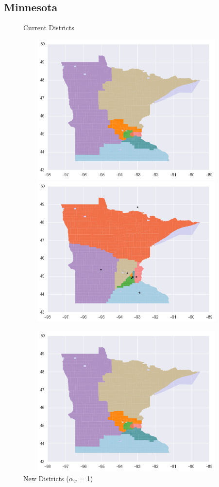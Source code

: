 \clearpage
\newpage

\subsection{Minnesota}
\begin{figure}[htb!] \centering
\caption{ Current Districts }
\includegraphics[width=5in,height=3in,keepaspectratio]{../maps/MN/static/before.png}
\includegraphics[width=5in,height=3in,keepaspectratio]{../maps/MN/static/0_0_after.png}
\caption{ New Districts ($\alpha_w$ = 1) }
\includegraphics[width=5in,height=3in,keepaspectratio]{../maps/MN/static/before.png}

\end{figure}
